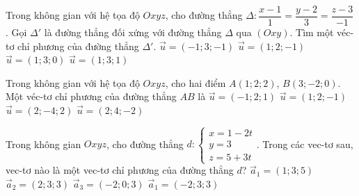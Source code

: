 	\begin{ex}%
	Trong không gian với hệ tọa độ $Oxyz$, cho đường thẳng $\Delta\colon \dfrac{x-1}{1}=\dfrac{y-2}{3}=\dfrac{z-3}{-1}$. Gọi $\Delta'$ là đường thẳng đối xứng với đường thẳng $\Delta$ qua $(Oxy)$. Tìm một véc-tơ chỉ phương của đường thẳng $\Delta'$.
	\choice
	{$\overrightarrow{u}=(-1;3;-1)$}
	{$\overrightarrow{u}=(1;2;-1)$}
	{$\overrightarrow{u}=(1;3;0)$}
	{\True $\overrightarrow{u}=(1;3;1)$}
	\end{ex}
	\begin{ex}%
	Trong không gian với hệ tọa độ $Oxyz$, cho hai điểm $A(1;2;2)$, $B(3;-2;0)$. Một véc-tơ chỉ phương của đường thẳng $AB$ là
	\choice
	{\True $\overrightarrow{u}=(-1;2;1)$}
	{$\overrightarrow{u}=(1;2;-1)$}
	{$\overrightarrow{u}=(2;-4;2)$}
	{$\overrightarrow{u}=(2;4;-2)$}
	\end{ex}
	\begin{ex}%
	Trong không gian $Oxyz$, cho đường thẳng $d:\begin{cases}x=1-2t \\ y=3 \\ z=5+3t \end{cases}$. Trong các vec-tơ sau, vec-tơ nào là một vec-tơ chỉ phương của đường thẳng $d$?
	\choice
	{$\overrightarrow{a}_1=(1;3;5)$}
	{$\overrightarrow{a}_2=(2;3;3)$}
	{\True $\overrightarrow{a}_3=(-2;0;3)$}
	{$\overrightarrow{a}_1=(-2;3;3)$}
	\end{ex}
